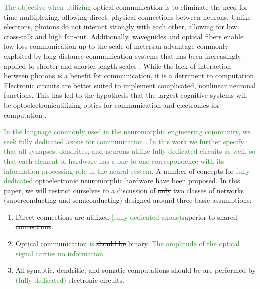 \documentclass[twocolumn]{article}
\begin{document}
\textcolor{ForestGreen}{The objective when utilizing }optical communication is to eliminate the need for time-multiplexing, allowing direct, physical connections between neurons. Unlike electrons, photons do not interact strongly with each other, allowing for low cross-talk and high fan-out. Additionally, waveguides and optical fibers enable low-loss communication up to the scale of meters\textemdash an advantage commonly exploited by long-distance communication systems that has been increasingly applied to shorter and shorter length scales \cite{miller2017attojoule}. While the lack of interaction between photons is a benefit for communication, it is a detriment to computation. Electronic circuits are better suited to implement complicated, nonlinear neuronal functions. This has led to the hypothesis that the largest cognitive systems will be optoelectronic\textemdash utilizing optics for communication and electronics for computation \cite{shainline2018largest}. 

\textcolor{ForestGreen}{In the language commonly used in the neuromorphic engineering community, we seek fully dedicated axons for communication \cite{seda2016}. In this work we further specify that all synapses, dendrites, and neurons utilize fully dedicated circuits as well, so that each element of hardware has a one-to-one correspondence with its information-processing role in the neural system.} A number of concepts for \textcolor{ForestGreen}{fully dedicated} optoelectronic neuromorphic hardware have been proposed. In this paper, we will restrict ourselves to a discussion of \sout{only} two classes of networks (superconducting and semiconducting) designed around three basic assumptions:


\begin{enumerate}
    \item Direct connections are utilized \textcolor{ForestGreen}{(fully dedicated axons)}\sout{superior to shared connections}.
    \item Optical communication \textcolor{ForestGreen}{is} \sout{should be} binary. \textcolor{ForestGreen}{The amplitude of the optical signal carries no information.}
    \item All synaptic, dendritic, and somatic computations \sout{should be} are performed by \textcolor{ForestGreen}{(fully dedicated)} electronic circuits.
\end{enumerate}
\end{document}
